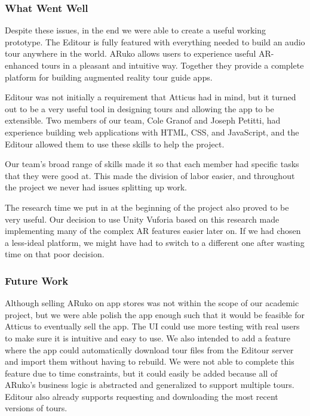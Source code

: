 \documentclass[a4paper, 10pt, american, titlepage]{article}
\begin{document}
\subsubsection{What Went Well}
\label{sec:whatWentWell}

Despite these issues, in the end we were able to create a useful working
prototype. The Editour is fully featured with everything needed to build an
audio tour anywhere in the world. ARuko allows users to experience useful
AR-enhanced tours in a pleasant and intuitive way. Together they provide a
complete platform for building augmented reality tour guide apps.

Editour was not initially a requirement that Atticus had in mind, but it turned
out to be a very useful tool in designing tours and allowing the app to be
extensible. Two members of our team, Cole Granof and Joseph Petitti, had
experience building web applications with HTML, CSS, and JavaScript, and the
Editour allowed them to use these skills to help the project.

Our team's broad range of skills made it so that each member had specific tasks
that they were good at. This made the division of labor easier, and throughout
the project we never had issues splitting up work.

The research time we put in at the beginning of the project also proved to be
very useful. Our decision to use Unity Vuforia based on this research made
implementing many of the complex AR features easier later on. If we had chosen a
less-ideal platform, we might have had to switch to a different one after
wasting time on that poor decision.

\subsubsection{Future Work}
\label{sec:futureWork}

Although selling ARuko on app stores was not within the scope of our academic
project, but we were able polish the app enough such that it would be feasible
for Atticus to eventually sell the app. The UI could use more testing with real
users to make sure it is intuitive and easy to use. We also intended to add a
feature where the app could automatically download tour files from the Editour
server and import them without having to rebuild. We were not able to complete
this feature due to time constraints, but it could easily be added because all
of ARuko's business logic is abstracted and generalized to support multiple
tours. Editour also already supports requesting and downloading the most recent
versions of tours.
\end{document}
